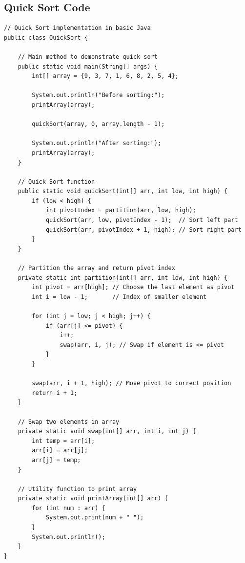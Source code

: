 \documentclass[letterpaper,12pt]{article}
\begin{document}
\subsection{Quick Sort Code}
\begin{verbatim}
// Quick Sort implementation in basic Java
public class QuickSort {

    // Main method to demonstrate quick sort
    public static void main(String[] args) {
        int[] array = {9, 3, 7, 1, 6, 8, 2, 5, 4};

        System.out.println("Before sorting:");
        printArray(array);

        quickSort(array, 0, array.length - 1);

        System.out.println("After sorting:");
        printArray(array);
    }

    // Quick Sort function
    public static void quickSort(int[] arr, int low, int high) {
        if (low < high) {
            int pivotIndex = partition(arr, low, high);
            quickSort(arr, low, pivotIndex - 1);  // Sort left part
            quickSort(arr, pivotIndex + 1, high); // Sort right part
        }
    }

    // Partition the array and return pivot index
    private static int partition(int[] arr, int low, int high) {
        int pivot = arr[high]; // Choose the last element as pivot
        int i = low - 1;       // Index of smaller element

        for (int j = low; j < high; j++) {
            if (arr[j] <= pivot) {
                i++;
                swap(arr, i, j); // Swap if element is <= pivot
            }
        }

        swap(arr, i + 1, high); // Move pivot to correct position
        return i + 1;
    }

    // Swap two elements in array
    private static void swap(int[] arr, int i, int j) {
        int temp = arr[i];
        arr[i] = arr[j];
        arr[j] = temp;
    }

    // Utility function to print array
    private static void printArray(int[] arr) {
        for (int num : arr) {
            System.out.print(num + " ");
        }
        System.out.println();
    }
} 
\end{verbatim}
\end{document}
